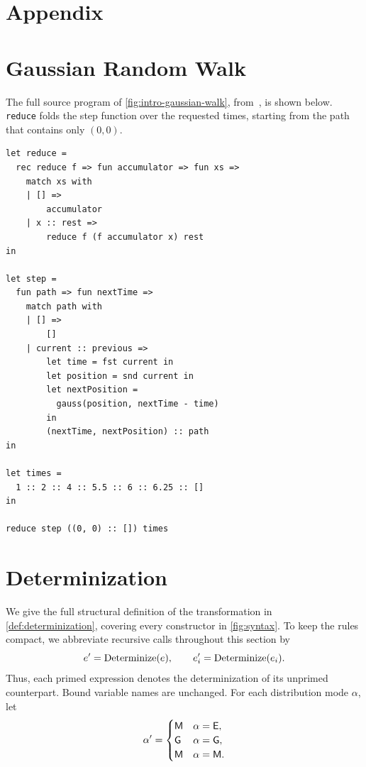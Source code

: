 \newpage
\section*{Appendix}
\label{sec:appendix}

\section{Gaussian Random Walk}
\label{sec:appendix-gauss-random-walk}

The full source program of \cref{fig:intro-gaussian-walk}, from~\cite{vakar2019domain},
is shown below. \texttt{reduce} folds the step function over the requested times,
starting from the path that contains only $(0,0)$.

\begin{lstlisting}
let reduce =
  rec reduce f => fun accumulator => fun xs =>
    match xs with
    | [] =>
        accumulator
    | x :: rest =>
        reduce f (f accumulator x) rest
in

let step =
  fun path => fun nextTime =>
    match path with
    | [] =>
        []
    | current :: previous =>
        let time = fst current in
        let position = snd current in
        let nextPosition =
          gauss(position, nextTime - time)
        in
        (nextTime, nextPosition) :: path
in

let times =
  1 :: 2 :: 4 :: 5.5 :: 6 :: 6.25 :: []
in

reduce step ((0, 0) :: []) times
\end{lstlisting}

\section{Determinization}
\label{sec:appendix-determinization}

We give the full structural definition of the transformation in
\cref{def:determinization}, covering every constructor
in \cref{fig:syntax}. To keep the rules compact, we abbreviate recursive
calls throughout this section by
\[
  e'=\operatorname{Determinize}(e),
  \qquad e_i'=\operatorname{Determinize}(e_i).
\]
Thus, each primed expression denotes the determinization of its unprimed
counterpart. Bound variable names are unchanged.
For each distribution mode $\alpha$, let
\[
  \alpha'=
  \begin{cases}
    \mathsf{M} & \alpha=\mathsf{E},\\
    \mathsf{G} & \alpha=\mathsf{G},\\
    \mathsf{M} & \alpha=\mathsf{M}.
  \end{cases}
\]



